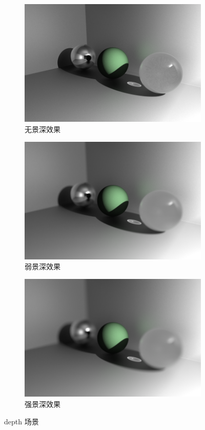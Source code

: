 \documentclass{ctexart}
\begin{document}
\begin{figure}[ht]
  \centering
  \begin{subfigure}{.45\textwidth}
    \centering
    \includegraphics[width=.8\linewidth]{final/depth/none.png}
    \caption{无景深效果}
  \end{subfigure}
  \begin{subfigure}{.45\textwidth}
    \centering
    \includegraphics[width=.8\linewidth]{final/depth/2_5.png}
    \caption{弱景深效果}
  \end{subfigure}
  \begin{subfigure}{\textwidth}
    \centering
    \includegraphics[width=.8\linewidth]{final/depth/5.png}
    \caption{强景深效果}
  \end{subfigure}
  \caption{depth 场景}
  \label{fig:depth}
\end{figure}
\end{document}
